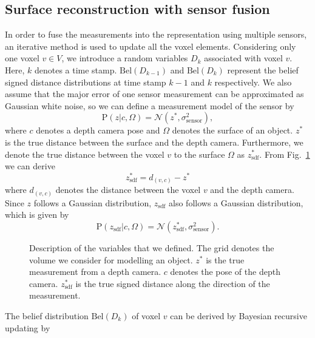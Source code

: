 \subsection{Surface reconstruction with sensor fusion}
In order to fuse the measurements into the representation using multiple sensors, an iterative method is used to update all the voxel elements. Considering only one voxel $v\in V$, we introduce a  random variables $D_{k}$ associated with voxel $v$. Here, $k$ denotes a time stamp. $\text{Bel}(D_{k-1})$ and $\text{Bel}(D_{k})$ represent the belief signed distance distributions at time stamp $k-1$ and $k$ respectively. We also assume that the major error of one sensor measurement can be approximated as Gaussian white noise, so we can define a measurement model of the sensor by
\begin{equation}
\text{P}(z|c,\Omega) = \mathcal{N}(z^*,  \sigma_\text{sensor}^2), 
\end{equation}
where $c$ denotes a depth camera pose and $\Omega$ denotes the surface of an object. $z^*$ is the true distance between the surface and the depth camera. Furthermore, we denote the true distance between the voxel $v$ to the surface $\Omega$ as $z_\text{sdf}^*$. From Fig.~\ref{fig:sdf} we can derive 
\begin{equation}
z_\text{sdf}^*  = d_{( v,c) } - z^*
\end{equation}
where $d_{( v,c) }$ denotes the distance between the voxel $v$ and the depth camera. Since $z$ follows a Gaussian distribution, $z_\text{sdf}$ also follows a Gaussian distribution, which is given by 
\begin{equation}
\text{P}(z_\text{sdf}|c,\Omega) = \mathcal{N}(z_\text{sdf}^*,  \sigma_\text{sensor}^2).
\end{equation}

\begin{figure}[!htbp]
\centering
\def\svgwidth{0.8\linewidth}

\caption{Description of the variables that we defined. The grid denotes the volume we consider for modelling an object. $z^*$ is the true measurement from a depth camera. $c$ denotes the pose of the depth camera. $ z_\text{sdf}^*$ is the true signed distance along the direction of the measurement.}
\label{fig:sdf}
\end{figure}	

The belief distribution  $\text{Bel}(D_{k})$ of voxel $v$ can be derived by Bayesian recursive updating by   


